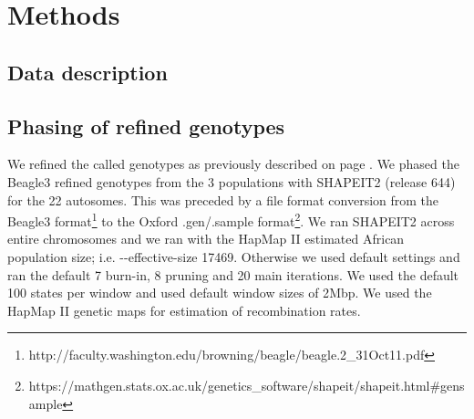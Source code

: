 \section{Methods}

\subsection{Data description}

\subsection{Phasing of refined genotypes}
We refined the called genotypes as previously described on page \pageref{subsec:AGVrefinement}.
We phased the Beagle3 refined genotypes from the 3 populations with SHAPEIT2\cite{Delaneau2012} (release 644) for the 22 autosomes. This was preceded by a file format conversion from the Beagle3 format\footnote{http://faculty.washington.edu/browning/beagle/beagle.2\_31Oct11.pdf} to the Oxford .gen/.sample format\footnote{https://mathgen.stats.ox.ac.uk/genetics\_software/shapeit/shapeit.html\#gensample}. We ran SHAPEIT2 across entire chromosomes and we ran with the HapMap II\cite{hapmap2007} estimated African population size\cite{Wright01031931}\cite{Wright1938}; i.e. -{}-effective-size 17469. Otherwise we used default settings and ran the default 7 burn-in, 8 pruning and 20 main iterations. We used the default 100 states per window and used default window sizes of 2\gls{Mbp}. We used the HapMap II genetic maps for estimation of recombination rates.

